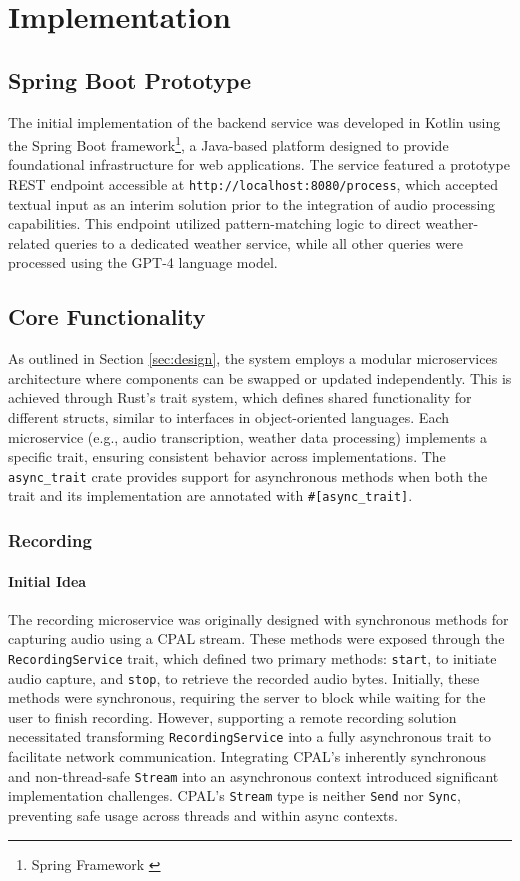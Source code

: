\renewcommand*\chapterpagestyle{scrheadings}
\chapter{Implementation}

\section{Spring Boot Prototype}
The initial implementation of the backend service was developed in Kotlin using the Spring Boot framework\footnote{Spring Framework \cite{spring}},
a Java-based platform designed to provide foundational infrastructure for web applications.
The service featured a prototype REST endpoint accessible at \texttt{http://localhost:8080/process},
which accepted textual input as an interim solution prior to the integration of audio processing capabilities.
This endpoint utilized pattern-matching logic to direct weather-related queries to a dedicated weather service,
while all other queries were processed using the GPT-4 language model.

\section{Core Functionality}
As outlined in Section \ref{sec:design}, the system employs a modular microservices architecture where components can be swapped or updated independently.
This is achieved through Rust's trait system, which defines shared functionality for different structs, similar to interfaces in object-oriented languages.
Each microservice (e.g., audio transcription, weather data processing) implements a specific trait, ensuring consistent behavior across implementations.
The \texttt{async\_trait} crate provides support for asynchronous methods when both the trait and its implementation are annotated with \texttt{\#[async\_trait]}.

\subsection{Recording}

\subsubsection{Initial Idea}
The recording microservice was originally designed with synchronous methods for capturing audio using a CPAL stream.
These methods were exposed through the \texttt{RecordingService} trait, which defined two primary methods: \texttt{start},
to initiate audio capture, and \texttt{stop}, to retrieve the recorded audio bytes.
Initially, these methods were synchronous, requiring the server to block while waiting for the user to finish recording.
However, supporting a remote recording solution necessitated transforming \texttt{RecordingService} into a fully asynchronous trait to facilitate network communication.
Integrating CPAL’s inherently synchronous and non-thread-safe \texttt{Stream} into an asynchronous context introduced significant implementation challenges.
CPAL’s \texttt{Stream} type is neither \texttt{Send} nor \texttt{Sync}, preventing safe usage across threads and within async contexts.

